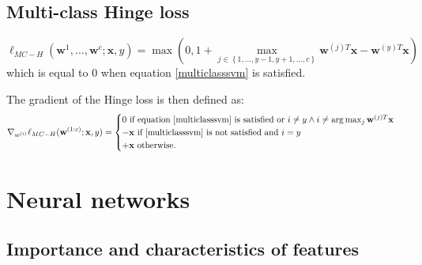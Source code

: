 \documentclass[a4paper,10pt,twoside]{article}
\begin{document}
\subsection{Multi-class Hinge loss}

\begin{equation*}
    \ell_{MC-H}(\mathbf{w}^{1},\ldots, \mathbf{w}^{c};\mathbf{x}, y)=\max(0,1+\max_{j\in\left\{1,\ldots, y-1,y+1, \ldots,c\right\}} \mathbf{w}^{(j)T}\mathbf{x}-\mathbf{w}^{(y)T}\mathbf{x})
\end{equation*}
which is equal to 0 when equation \ref{multiclasssvm} is satisfied. 

The gradient of the Hinge loss is then defined as:
\begin{equation*}
    \nabla_{w^{(i)}}\ell_{MC-H}(\mathbf{w}^{(1:c)};\mathbf{x},y) = \begin{cases}
        0 \text{ if equation \ref{multiclasssvm} is satisfied or } i\neq y\land i\neq \arg\max_{j}\mathbf{w}^{(j)T}\mathbf{x}\\
        -\mathbf{x} \text{ if \ref{multiclasssvm} is not satisfied and } i=y\\
        +\mathbf{x} \text{ otherwise.}
    \end{cases}
\end{equation*}

\section{Neural networks}

\subsection{Importance and characteristics of features}
\end{document}
